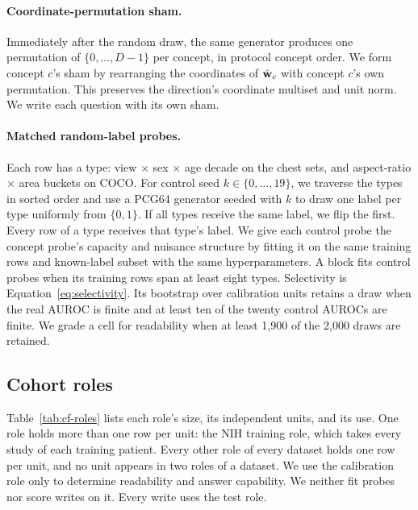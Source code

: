 \documentclass{article}
\begin{document}
\paragraph{Coordinate-permutation sham.} Immediately after the random draw, the same generator produces one permutation of $\{0,\dots,D{-}1\}$ per concept, in protocol concept order. We form concept $c$'s sham by rearranging the coordinates of $\hat{\mathbf{w}}_c$ with concept $c$'s own permutation. This preserves the direction's coordinate multiset and unit norm. We write each question with its own sham.

\paragraph{Matched random-label probes.} Each row has a type: view $\times$ sex $\times$ age decade on the chest sets, and aspect-ratio $\times$ area buckets on COCO. For control seed $k\in\{0,\dots,19\}$, we traverse the types in sorted order and use a PCG64 generator seeded with $k$ to draw one label per type uniformly from $\{0,1\}$. If all types receive the same label, we flip the first. Every row of a type receives that type's label. We give each control probe the concept probe's capacity and nuisance structure by fitting it on the same training rows and known-label subset with the same hyperparameters. A block fits control probes when its training rows span at least eight types. Selectivity is Equation~\ref{eq:selectivity}. Its bootstrap over calibration units retains a draw when the real AUROC is finite and at least ten of the twenty control AUROCs are finite. We grade a cell for readability when at least 1{,}900 of the 2{,}000 draws are retained.

\subsection{Cohort roles}
\label{app:repro-cohorts}

Table~\ref{tab:cf-roles} lists each role's size, its independent units, and its use. One role holds more than one row per unit: the NIH training role, which takes every study of each training patient. Every other role of every dataset holds one row per unit, and no unit appears in two roles of a dataset. We use the calibration role only to determine readability and answer capability. We neither fit probes nor score writes on it. Every write uses the test role.
\end{document}
